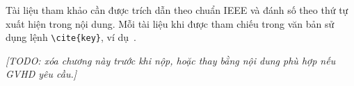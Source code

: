 \documentclass[../main.tex]{subfiles}
\begin{document}

Tài liệu tham khảo cần được trích dẫn theo chuẩn IEEE và đánh số theo thứ tự xuất hiện trong nội dung. Mỗi tài liệu khi được tham chiếu trong văn bản sử dụng lệnh \texttt{\textbackslash cite\{key\}}, ví dụ~\cite{zalominiapp}.

\textit{[TODO: xóa chương này trước khi nộp, hoặc thay bằng nội dung phù hợp nếu GVHD yêu cầu.]}
\end{document}
